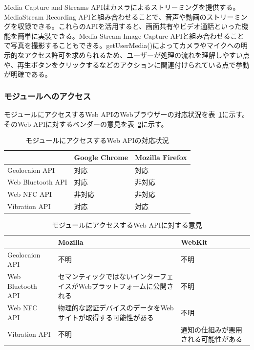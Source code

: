 Media Capture and Streams APIはカメラによるストリーミングを提供する。MediaStream Recording APIと組み合わせることで、音声や動画のストリーミングを収録できる。これらのAPIを活用すると、画面共有やビデオ通話といった機能を簡単に実装できる。Media Stream Image Capture APIと組み合わせることで写真を撮影することもできる。getUserMedia()によってカメラやマイクへの明示的なアクセス許可を求められるため、ユーザーが処理の流れを理解しやすい点や、再生ボタンをクリックするなどのアクションに関連付けられている点で挙動が明確である。

\subsubsection{モジュールへのアクセス}
\label{subsubsection:モジュールへのアクセス}
モジュールにアクセスするWeb APIのWebブラウザーの対応状況を表~\ref{table:モジュールにアクセスするWeb APIの対応状況}に示す。そのWeb APIに対するベンダーの意見を表~\ref{table:モジュールにアクセスするWeb APIに対する意見}に示す。
\begin{table}
  \caption{モジュールにアクセスするWeb APIの対応状況}
  \label{table:モジュールにアクセスするWeb APIの対応状況}
  \centering
  \begin{tabular}{|p{13em}|p{8em}|p{8em}|}
    \hline
    & Google Chrome & Mozilla Firefox \\ \hline
    Geolocaion API & \cellcolor{green!25}対応 & \cellcolor{green!25}対応 \\ \hline
    Web Bluetooth API & \cellcolor{green!25}対応 & \cellcolor{red!25}非対応 \\ \hline
    Web NFC API & \cellcolor{red!25}非対応 & \cellcolor{red!25}非対応 \\ \hline
    Vibration API & \cellcolor{green!25}対応 & \cellcolor{green!25}対応 \\ \hline
  \end{tabular}
\end{table}
\begin{table}
    \centering
    \caption{モジュールにアクセスするWeb APIに対する意見}
    \label{table:モジュールにアクセスするWeb APIに対する意見}
    \begin{tabular}{|p{13em}|p{13em}|p{13em}|}
         \hline
         & Mozilla & WebKit \\ \hline
         Geolocaion API & 不明 & 不明 \\ \hline
         Web Bluetooth API & \cellcolor{red!25}セマンティックではないインターフェイスがWebプラットフォームに公開される~\cite{MozillaWebBluetoothAPI} & 不明 \\ \hline
         Web NFC API & \cellcolor{red!25}物理的な認証デバイスのデータをWebサイトが取得する可能性がある~\cite{MozillaWebNFCAPI} & 不明 \\ \hline
         Vibration API & 不明 & \cellcolor{red!25}通知の仕組みが悪用される可能性がある \\ \hline
    \end{tabular}
\end{table}
